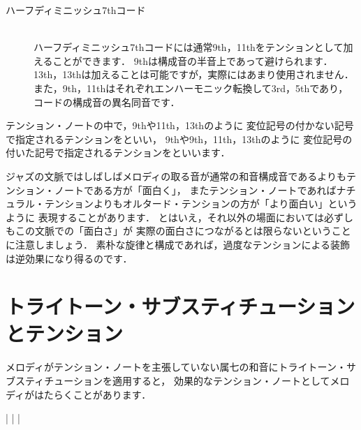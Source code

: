 \documentclass[dvipdfmx,uplatex,b5paper,openany,jbase=12Q,nomag*,textwidth-limit=44%
               ]{gachimuchi}[2020/05/05]
\begin{document}
\begin{description}
\begin{Music}
    \en%
    \endpiece
  \end{Music}
  \item[ハーフディミニッシュ7thコード] ~\\
  ハーフディミニッシュ7thコードには通常9th，11thをテンションとして加えることができます．
  \bFlat9thは構成音の半音上であって避けられます．
  \bFlat13th，\bNatural13thは加えることは可能ですが，実際にはあまり使用されません．
  また，\bSharp 9th，\bSharp 11thはそれぞれエンハーモニック転換して\bFlat 3rd，\bFlat 5thであり，コードの構成音の異名同音です．
  \begin{Music}
    \nostartrule%
    \Startpiece
    \Notes%
    \en%
    \endpiece
  \end{Music}
\end{description}

テンション・ノートの中で，9thや11th，13thのように
変位記号の付かない記号で指定されるテンションをといい，
\bFlat9thや\bSharp 9th，\bSharp 11th，\bFlat13thのように
変位記号の付いた記号で指定されるテンションをといいます．

ジャズの文脈ではしばしばメロディの取る音が通常の和音構成音であるよりもテンション・ノートである方が「面白く」，
またテンション・ノートであればナチュラル・テンションよりもオルタード・テンションの方が「より面白い」というように
表現することがあります．
とはいえ，それ以外の場面においては必ずしもこの文脈での「面白さ」が
実際の面白さにつながるとは限らないということに注意しましょう．
素朴な旋律と構成であれば，過度なテンションによる装飾は逆効果になり得るのです．

\section{トライトーン・サブスティチューションとテンション}
メロディがテンション・ノートを主張していない属七の和音にトライトーン・サブスティチューションを適用すると，
効果的なテンション・ノートとしてメロディがはたらくことがあります．
\begin{Music}
  \Startpiece
  \Notes%
  |\figbassu[8]%
  \figbassu[9]%
  \figbassu[3]%
  \figbassu[11]%
  \figbassu[5]%
  \figbassu[6]%
  \figbassu[\bFlat7]%
  \en\bar%
  \Notes%
  |\figbassu[\bSharp11]%
  \figbassu[\bSharp5][\bFlat13]%
  \figbassu[\bFlat7]%
  \figbassu[\bNatural7]%
  \figbassu[\bFlat9]%
  \figbassu[\bSharp9]%
  \figbassu[3]%
  \en
  \endpiece
\end{Music}
\end{document}
